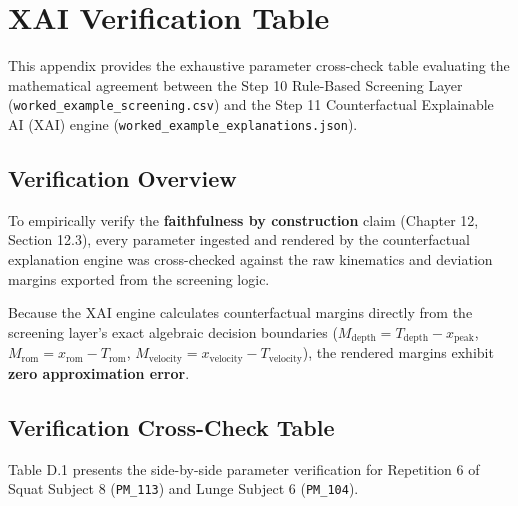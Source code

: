 \chapter{XAI Verification Table}
\label{app:xai-verify}



This appendix provides the exhaustive parameter cross-check table evaluating the mathematical agreement between the Step 10 Rule-Based Screening Layer (\texttt{worked\_example\_screening.csv}) and the Step 11 Counterfactual Explainable AI (XAI) engine (\texttt{worked\_example\_explanations.json}).



\section{Verification Overview}
\label{sec:c-1-verification-overview}


To empirically verify the \textbf{faithfulness by construction} claim (Chapter 12, Section 12.3), every parameter ingested and rendered by the counterfactual explanation engine was cross-checked against the raw kinematics and deviation margins exported from the screening logic.

Because the XAI engine calculates counterfactual margins directly from the screening layer's exact algebraic decision boundaries ($M_{\text{depth}} = T_{\text{depth}} - x_{\text{peak}}$, $M_{\text{rom}} = x_{\text{rom}} - T_{\text{rom}}$, $M_{\text{velocity}} = x_{\text{velocity}} - T_{\text{velocity}}$), the rendered margins exhibit \textbf{zero approximation error}.



\section{Verification Cross-Check Table}
\label{sec:c-2-verification-cross-check-table}


Table D.1 presents the side-by-side parameter verification for Repetition 6 of Squat Subject 8 (\texttt{PM\_113}) and Lunge Subject 6 (\texttt{PM\_104}).

